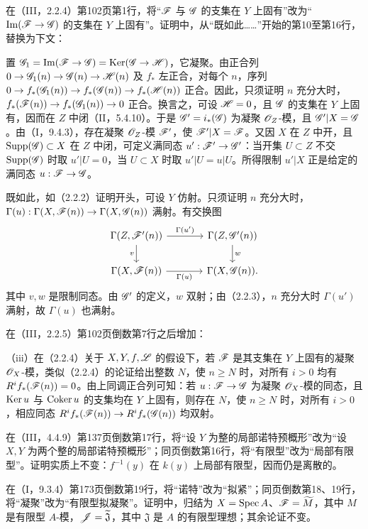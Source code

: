 在（III，2.2.4）第102页第1行，将“$\mathscr F$ 与 $\mathscr G$ 的支集在 $Y$ 上固有”改为“$\operatorname{Im}(\mathscr F\to\mathscr G)$ 的支集在 $Y$ 上固有”。证明中，从“既如此……”开始的第10至第16行，替换为下文：

置 $\mathscr G_1=\operatorname{Im}(\mathscr F\to\mathscr G)=\operatorname{Ker}(\mathscr G\to\mathscr H)$，它凝聚。由正合列 $0\to\mathscr G_1(n)\to\mathscr G(n)\to\mathscr H(n)$ 及 $f_*$ 左正合，对每个 $n$，序列 $0\to f_*(\mathscr G_1(n))\to f_*(\mathscr G(n))\to f_*(\mathscr H(n))$ 正合。因此，只须证明 $n$ 充分大时，$f_*(\mathscr F(n))\to f_*(\mathscr G_1(n))\to0$ 正合。换言之，可设 $\mathscr H=0$，且 $\mathscr G$ 的支集在 $Y$ 上固有，因而在 $Z$ 中闭（II，5.4.10）。于是 $\mathscr G'=i_*(\mathscr G)$ 为凝聚 $\mathscr O_Z$-模，且 $\mathscr G'|X=\mathscr G$。由（I，9.4.3），存在凝聚 $\mathscr O_Z$-模 $\mathscr F'$，使 $\mathscr F'|X=\mathscr F$。又因 $X$ 在 $Z$ 中开，且 $\operatorname{Supp}(\mathscr G)\subset X$ 在 $Z$ 中闭，可定义满同态 $u':\mathscr F'\to\mathscr G'$：当开集 $U\subset Z$ 不交 $\operatorname{Supp}(\mathscr G)$ 时取 $u'|U=0$，当 $U\subset X$ 时取 $u'|U=u|U$。所得限制 $u'|X$ 正是给定的满同态 $u:\mathscr F\to\mathscr G$。

既如此，如（2.2.2）证明开头，可设 $Y$ 仿射。只须证明 $n$ 充分大时，$\Gamma(u):\Gamma(X,\mathscr F(n))\to\Gamma(X,\mathscr G(n))$ 满射。有交换图
\[
\begin{tikzcd}[column sep=large]
\Gamma(Z,\F'(n))\arrow[r,"\Gamma(u')"]\arrow[d,"v"']&\Gamma(Z,\G'(n))\arrow[d,"w"]\\
\Gamma(X,\F(n))\arrow[r,"\Gamma(u)"']&\Gamma(X,\G(n)).
\end{tikzcd}
\]
其中 $v,w$ 是限制同态。由 $\mathscr G'$ 的定义，$w$ 双射；由（2.2.3），$n$ 充分大时 $\Gamma(u')$ 满射，故 $\Gamma(u)$ 也满射。

在（III，2.2.5）第102页倒数第7行之后增加：

（iii）在（2.2.4）关于 $X,Y,f,\mathscr L$ 的假设下，若 $\mathscr F$ 是其支集在 $Y$ 上固有的凝聚 $\mathscr O_X$-模，类似（2.2.4）的论证给出整数 $N$，使 $n\geq N$ 时，对所有 $i>0$ 均有 $R^if_*(\mathscr F(n))=0$。由上同调正合列可知：若 $u:\mathscr F\to\mathscr G$ 为凝聚 $\mathscr O_X$-模的同态，且 $\operatorname{Ker} u$ 与 $\operatorname{Coker} u$ 的支集均在 $Y$ 上固有，则存在 $N$，使 $n\geq N$ 时，对所有 $i>0$，相应同态 $R^if_*(\mathscr F(n))\to R^if_*(\mathscr G(n))$ 均双射。

在（III，4.4.9）第137页倒数第17行，将“设 $Y$ 为整的局部诺特预概形”改为“设 $X,Y$ 为两个整的局部诺特预概形”；同页倒数第16行，将“有限型”改为“局部有限型”。证明实质上不变：$f^{-1}(y)$ 在 $k(y)$ 上局部有限型，因而仍是离散的。

在（I，9.3.4）第173页倒数第19行，将“诺特”改为“拟紧”；同页倒数第18、19行，将“凝聚”改为“有限型拟凝聚”。证明中，归结为 $X=\operatorname{Spec} A$、$\mathscr F=\widetilde M$，其中 $M$ 是有限型 $A$-模，$\mathscr J=\widetilde{\mathfrak J}$，其中 $\mathfrak J$ 是 $A$ 的有限型理想；其余论证不变。

